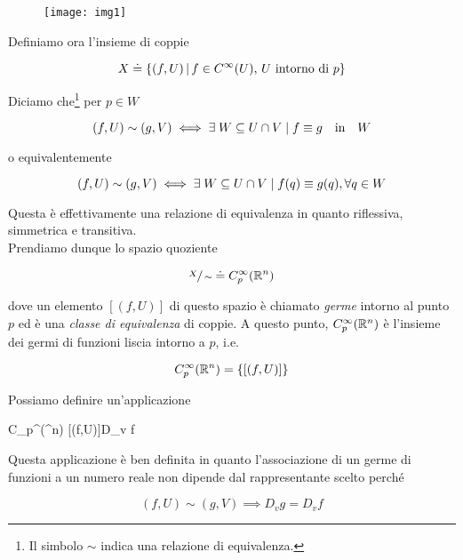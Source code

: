 \begin{figure}[H]
	\centering
	\texttt{[image: img1]}
\end{figure}

Definiamo ora l'insieme di coppie

\begin{equation}
	X \doteq \left\{ (f,U) \, \middle| \, f \in C^{\infty}(U), \, \text{$ U $ intorno di $ p $} \right\}
\end{equation}

Diciamo che\footnote{%
	Il simbolo $ \sim $ indica una relazione di equivalenza.%
} per $ p \in W $

\begin{equation}
	(f,U) \sim (g,V) \iff \E W \subseteq U \cap V \mid f \equiv g \qq{in} W
\end{equation}

o equivalentemente

\begin{equation}
	(f,U) \sim (g,V) \iff \exists \; W \subseteq U \cap V \mid f(q) \equiv g(q), \forall q \in W
\end{equation}

Questa è effettivamente una relazione di equivalenza in quanto riflessiva, simmetrica e transitiva.\\
Prendiamo dunque lo spazio quoziente

\begin{equation}
	\sfrac{X}{\sim} \doteq C_{p}^{\infty}(\mathbb{R}^{n})
\end{equation}

dove un elemento $ [(f,U)] $ di questo spazio è chiamato \textit{germe} intorno al punto $ p $ ed è una \textit{classe di equivalenza} di coppie. A questo punto, $ C_{p}^{\infty}(\mathbb{R}^{n}) $ è l'insieme dei germi di funzioni liscia intorno a $ p $, i.e.

\begin{equation}
	C_{p}^{\infty}(\mathbb{R}^{n}) = \left\{ [(f,U)] \right\}
\end{equation} 

Possiamo definire un'applicazione

%
	{C_{p}^{\infty}(\R^{n})}{\R}%
	{[(f,U)]}{D_{v} f}

Questa applicazione è ben definita in quanto l'associazione di un germe di funzioni a un numero reale non dipende dal rappresentante scelto perché

\begin{equation}
	(f,U) \sim (g,V) \implies D_{v} g = D_{v} f
\end{equation}

